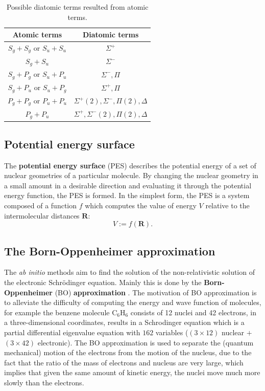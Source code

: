\documentclass[12pt]{article}
\begin{document}
\begin{table}[htb]
\centering
\caption{Possible diatomic terms resulted from atomic terms.}
\label{tb:spectroscopicnotation}
\begin{tabular}{|c|c|}
\hline
\textbf{Atomic terms} & \textbf{Diatomic terms} \\ \hline
$S_g + S_g$ or $S_u + S_u$           & $\Sigma^{+}$                      \\ \hline
$S_g + S_u$                      & $\Sigma^{-}$                      \\ \hline
$S_g + P_g$ or $S_u + P_u$           & $\Sigma^{-}, \Pi $                  \\ \hline
$S_g + P_u$ or $S_u + P_g$           & $\Sigma^{+}, \Pi $                  \\ \hline
$P_g + P_g$ or $P_u + P_u$           & $\Sigma^{+}(2), \Sigma^{-}, \Pi(2), \Delta$      \\ \hline
$P_g + P_u$                      & $\Sigma^{+}, \Sigma^{-}(2), \Pi(2), \Delta  $    \\ \hline
\end{tabular}
\end{table}


\subsection{Potential energy surface}
The \textbf{potential energy surface} (PES) describes the potential energy of a set of nuclear geometries of a particular molecule. By changing the nuclear geometry in a small amount in a desirable direction and evaluating it through the potential energy function, the PES is formed. In the simplest form, the PES is a system composed of a function $f$ which computes the value of energy $V$ relative to the intermolecular distances $\mathbf{R}$:
\begin{equation}
    V := f(\mathbf{R}).
\end{equation}



\subsection{The Born-Oppenheimer approximation}
The \textit{ab initio} methods aim to find the solution of the non-relativistic solution of the electronic Schrödinger equation. Mainly this is done by the \textbf{Born-Oppenheimer} (BO) \textbf{approximation} \cite{bo}. The motivation of BO approximation is to alleviate the difficulty of computing the energy and wave function of molecules, for example the benzene molecule C$_6$H$_6$ consists of 12 nuclei and 42 electrons, in a three-dimensional coordinates, results in a Schrodinger equation which is a partial differential eigenvalue equation with $162$ variables ($(3 \times 12)$ nuclear $+$ $(3 \times 42)$ electronic). The BO approximation is used to separate the (quantum mechanical) motion of the electrons from the motion of the nucleus, due to the fact that the ratio of the mass of electrons and nucleus are very large, which implies that given the same amount of kinetic energy, the nuclei move much more slowly than the electrons. 
\end{document}
